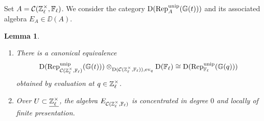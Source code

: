 \documentclass[a4paper, 10pt, oneside, reqno]{amsart}
\theoremstyle{plain}
\newtheorem{lem}[thm]{Lemma}
\theoremstyle{definition}
\theoremstyle{remark}
\newcommand{\Gbb}{\mathbb{G}}
\begin{document}
Set $A = \mathcal{C}(\mathbb{Z}_{\ell}^{\times}, \mathbb{F}_{\ell})$. We consider the category $\DD(\Rep_A^{\unip}(\Gbb(t)))$ and its associated algebra $E_A \in \DD(A)$.


\begin{lem}\label{lem:structure-modular-generic-representation}
\begin{enumerate}
\item There is a canonical equivalence 
\begin{equation}\label{eq:reduction-functor}
\DD(\Rep_{\Ccal(\Zl^{\times}, \Fl)}^{\unip}(\Gbb(t))) \otimes_{\DD({\Ccal(\Zl^{\times}, \Fl)}), \ev_q} \DD(\Fl) \cong \DD(\Rep_{\Fl}^{\unip}(\Gbb(q)))
\end{equation}
obtained by evaluation at $q \in \mathbb{Z}_{\ell}^{\times}$. 
\item Over $U \subset \underline{\mathbb{Z}_{\ell}^{\times}}$, the algebra $E_{\mathcal{C}(\mathbb{Z}_{\ell}^{\times}, \mathbb{F}_{\ell})}$ is concentrated in degree $0$ and locally of finite presentation. 
\end{enumerate}
\end{lem}
\end{document}
